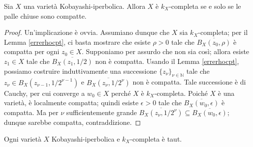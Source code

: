 \begin{lm} \label{comp_is_comp}
    Sia $X$ una varietà Kobayashi-iperbolica. Allora $X$ è $k_X$-completa se e solo se le palle chiuse sono compatte.
\end{lm}

\begin{proof}
    Un'implicazione è ovvia. Assumiano dunque che $X$ sia $k_X$-completa; per il Lemma \ref{errerhocpt}, ci basta mostrare che esiste $\rho>0$ tale che $\overline{B_X(z_0,\rho)}$ è compatta per ogni $z_0\in X$. Supponiamo per assurdo che non sia così; allora esiste $z_1\in X$ tale che $\overline{B_X(z_1,1/2)}$ non è compatta. Usando il Lemma \ref{errerhocpt}, possiamo costruire induttivamente una successione $\{z_\nu\}_{\nu\in\mathbb{N}}$ tale che $z_\nu\in B_X(z_{\nu-1},1/2^{\nu-1})$ e $\overline{B_X(z_\nu,1/2^\nu)}$ non è compatta. Tale successione è di Cauchy, per cui converge a $w_0\in X$ perché $X$ è $k_X$-completa. Poiché $X$ è una varietà, è localmente compatta; quindi esiste $\epsilon>0$ tale che $\overline{B_X(w_0,\epsilon)}$ è compatta. Ma per $\nu$ sufficientemente grande $\overline{B_X(z_\nu,1/2^\nu)}\subseteq\overline{B_X(w_0,\epsilon)}$; dunque sarebbe compatta, contraddizione.
\end{proof}

\begin{prop} \label{comp_is_taut}
    Ogni varietà $X$ Kobayashi-iperbolica e $k_X$-completa è taut.
\end{prop}

